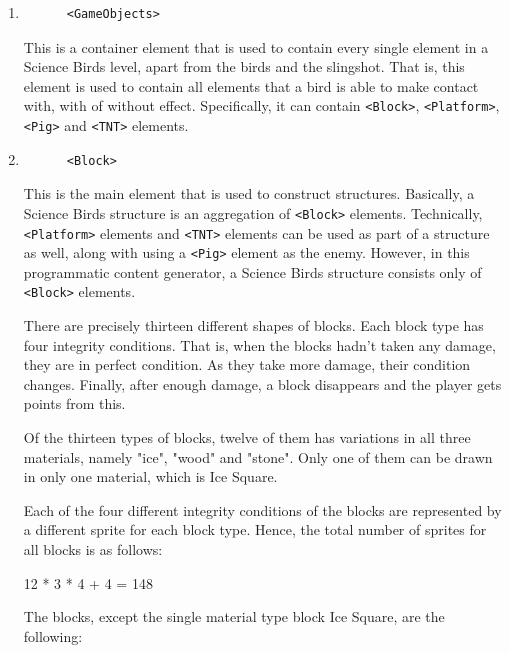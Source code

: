 \documentclass{dalthesis}
\begin{document}
\begin{enumerate}
\begin{enumerate}
    \item

    \begin{lstlisting}
      <GameObjects>
    \end{lstlisting}

    This is a container element that is used to contain every single element in a Science Birds level, apart from the birds and the slingshot. That is, this element is used to contain all elements that a bird is able to make contact with, with of without effect. Specifically, it can contain \lstinline{<Block>}, \lstinline{<Platform>}, \lstinline{<Pig>} and \lstinline{<TNT>} elements.

    \item

    \begin{lstlisting}
      <Block>
    \end{lstlisting}

    This is the main element that is used to construct structures. Basically, a Science Birds structure is an aggregation of \lstinline{<Block>} elements. Technically, \lstinline{<Platform>} elements and \lstinline{<TNT>} elements can be used as part of a structure as well, along with using a \lstinline{<Pig>} element as the enemy. However, in this programmatic content generator, a Science Birds structure consists only of \lstinline{<Block>} elements.

    There are precisely thirteen different shapes of blocks. Each block type has four integrity conditions. That is, when the blocks hadn't taken any damage, they are in perfect condition. As they take more damage, their condition changes. Finally, after enough damage, a block disappears and the player gets points from this.

    Of the thirteen types of blocks, twelve of them has variations in all three materials, namely "ice", "wood" and "stone". Only one of them can be drawn in only one material, which is Ice Square.

    Each of the four different integrity conditions of the blocks are represented by a different sprite for each block type. Hence, the total number of sprites for all blocks is as follows:

        12 * 3 * 4 + 4 = 148

    The blocks, except the single material type block Ice Square, are the following:


\end{enumerate}
\end{enumerate}
\end{document}
